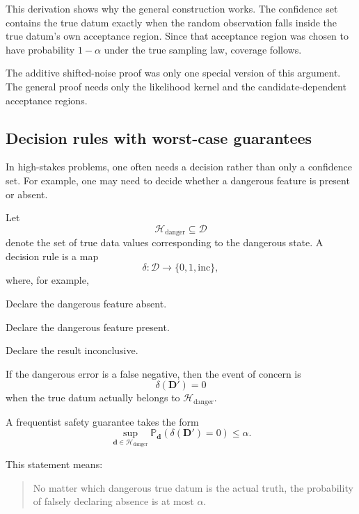\documentclass[11pt]{article}
\newcommand{\Dspace}{\mathcal D}
\newcommand{\Dobsrand}{\mathbf D'}
\newcommand{\dobs}{\mathbf d_{\mathrm{obs}}}
\newcommand{\Prob}{\mathbb P}
\begin{document}
This derivation shows why the general construction works. The confidence set contains the true datum exactly when the random observation falls inside the true datum's own acceptance region. Since that acceptance region was chosen to have probability \(1-\alpha\) under the true sampling law, coverage follows.

The additive shifted-noise proof was only one special version of this argument. The general proof needs only the likelihood kernel and the candidate-dependent acceptance regions.

\subsection{Decision rules with worst-case guarantees}

In high-stakes problems, one often needs a decision rather than only a confidence set. For example, one may need to decide whether a dangerous feature is present or absent.

Let
\[
    \mathcal H_{\mathrm{danger}}\subseteq\Dspace
\]
denote the set of true data values corresponding to the dangerous state. A decision rule is a map
\[
    \delta:\Dspace\to\{0,1,\mathrm{inc}\},
\]
where, for example,
\begin{description}[leftmargin=2.8cm,style=nextline]
    \item[\(\delta(\dobs)=0\).]
    Declare the dangerous feature absent.

    \item[\(\delta(\dobs)=1\).]
    Declare the dangerous feature present.

    \item[\(\delta(\dobs)=\mathrm{inc}\).]
    Declare the result inconclusive.
\end{description}

If the dangerous error is a false negative, then the event of concern is
\[
    \delta(\Dobsrand)=0
\]
when the true datum actually belongs to \(\mathcal H_{\mathrm{danger}}\).

A frequentist safety guarantee takes the form
\[
    \sup_{\mathbf d\in\mathcal H_{\mathrm{danger}}}
    \Prob_{\mathbf d}
    \left(
        \delta(\Dobsrand)=0
    \right)
    \leq
    \alpha.
\]

This statement means:
\begin{quote}
    No matter which dangerous true datum is the actual truth, the probability of falsely declaring absence is at most \(\alpha\).
\end{quote}
\end{document}
